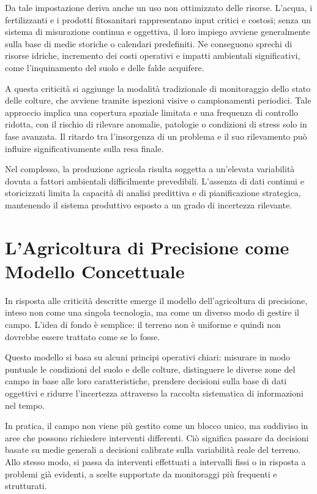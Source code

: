 Da tale impostazione deriva anche un uso non ottimizzato delle risorse. L’acqua, i fertilizzanti e i prodotti fitosanitari rappresentano input critici e costosi; senza un sistema di misurazione continua e oggettiva, il loro impiego avviene generalmente sulla base di medie storiche o calendari predefiniti. Ne conseguono sprechi di risorse idriche, incremento dei costi operativi e impatti ambientali significativi, come l’inquinamento del suolo e delle falde acquifere.\newline


A questa criticità si aggiunge la modalità tradizionale di monitoraggio dello stato delle colture, che avviene tramite ispezioni visive o campionamenti periodici. Tale approccio implica una copertura spaziale limitata e una frequenza di controllo ridotta, con il rischio di rilevare anomalie, patologie o condizioni di stress solo in fase avanzata. Il ritardo tra l’insorgenza di un problema e il suo rilevamento può influire significativamente sulla resa finale.\newline


Nel complesso, la produzione agricola risulta soggetta a un’elevata variabilità dovuta a fattori ambientali difficilmente prevedibili. L’assenza di dati continui e storicizzati limita la capacità di analisi predittiva e di pianificazione strategica, mantenendo il sistema produttivo esposto a un grado di incertezza rilevante.


\section{L’Agricoltura di Precisione come Modello Concettuale}
In risposta alle criticità descritte emerge il modello dell’agricoltura di precisione, inteso non come una singola tecnologia, ma come un diverso modo di gestire il campo. L’idea di fondo è semplice: il terreno non è uniforme e quindi non dovrebbe essere trattato come se lo fosse.

Questo modello si basa su alcuni principi operativi chiari: misurare in modo puntuale le condizioni del suolo e delle colture, distinguere le diverse zone del campo in base alle loro caratteristiche, prendere decisioni sulla base di dati oggettivi e ridurre l’incertezza attraverso la raccolta sistematica di informazioni nel tempo.

In pratica, il campo non viene più gestito come un blocco unico, ma suddiviso in aree che possono richiedere interventi differenti. Ciò significa passare da decisioni basate su medie generali a decisioni calibrate sulla variabilità reale del terreno. Allo stesso modo, si passa da interventi effettuati a intervalli fissi o in risposta a problemi già evidenti, a scelte supportate da monitoraggi più frequenti e strutturati.

